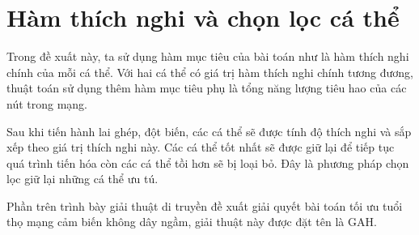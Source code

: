 \section{Hàm thích nghi và chọn lọc cá thể}
Trong đề xuất này, ta sử dụng hàm mục tiêu của bài toán như là hàm thích nghi chính của mỗi cá thể. Với hai cá thể có giá trị hàm thích nghi chính tương đương, thuật toán sử dụng thêm hàm mục tiêu phụ là tổng năng lượng tiêu hao của các nút trong mạng.

Sau khi tiến hành lai ghép, đột biến, các cá thể sẽ được tính độ thích nghi và sắp xếp theo giá trị thích nghi này. Các cá thể tốt nhất sẽ được giữ lại để tiếp tục quá trình tiến hóa còn các cá thể tồi hơn sẽ bị loại bỏ. Đây là phương pháp chọn lọc giữ lại những cá thể ưu tú.

Phần trên trình bày giải thuật di truyền đề xuất  giải quyết bài toán tối ưu tuổi thọ mạng cảm biến không dây ngầm, giải thuật này được đặt tên là GAH.